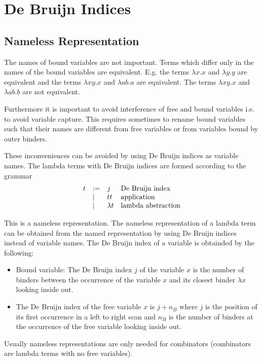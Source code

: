 \documentclass[12pt]{article}
\begin{document}
\section{De Bruijn Indices}
\label{sec-de-bruijn}






\subsection{Nameless Representation}
\label{sec-nameless-representation}



The names of bound variables are not important. Terms which differ only in
the names of the bound variables are equivalent. E.g. the terms $\lambda x . x$
and $\lambda y. y$ are equivalent and the terms $\lambda x y . x$ and $\lambda a
b . a$ are equivalent. The terms $\lambda x y . x$ and $\lambda a b . b$ are not
equivalent.

Furthermore it is important to avoid interference of free and bound variables
i.e. to avoid variable capture. This requires sometimes to rename bound
variables such that their names are different from free variables or from
variables bound by outer binders.

These inconveniences can be avoided by using De Bruijn indices as variable
names. The lambda terms with De Bruijn indices are formed according to the
grammar
$$
\begin{array}{lllll} 
    t &:=& j            & \text{De Bruijn index}
    \\
    &\mid& t t          & \text{application}
    \\
    &\mid& \lambda t    & \text{lambda abstraction}
 \end{array}
$$

This is a nameless representation. The nameless representation of a lambda term
can be obtained from the named representation by using De Bruijn indices instead
of variable names. The De Bruijn index of a variable is obtainded by the
following:
\begin{itemize}
    \item Bound variable: The De Bruijn index $j$ of the variable $x$ is the
        number of binders between the occurrence of the variable $x$ and its
        closest binder $\lambda x$ looking inside out.

    \item The De Bruijn index of the free variable $x$ is $j + n_B$ where $j$ is
        the position of its first occurrence in a left to right scan and $n_B$
        is the number of binders at the occurrence of the free variable looking
        inside out.
\end{itemize}
Usually nameless representations are only needed for combinators (combinators
are lambda terms with no free variables).
\end{document}
